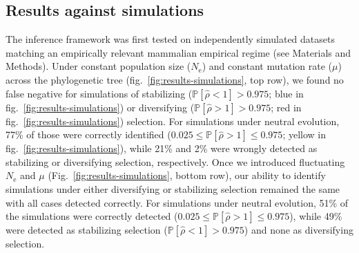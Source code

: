 \documentclass{article}
\newcommand{\Ne}{N_{\text{e}}}
\newcommand{\proba}{\mathbb{P}}
\newcommand{\MutationRate}{\mu}
\newcommand{\EstNI}{\widehat{\rho}}
\begin{document}
\subsection*{Results against simulations}\label{subsec:results-against-simulations}

The inference framework was first tested on independently simulated datasets matching an empirically relevant mammalian empirical regime (see Materials and Methods).
Under constant population size ($\Ne$) and constant mutation rate ($\MutationRate$) across the phylogenetic tree (fig.~\ref{fig:results-simulations}, top row), we found no false negative for simulations of stabilizing ($\proba [\EstNI < 1] > 0.975$; blue in fig.~\ref{fig:results-simulations}) or diversifying ($\proba [\EstNI > 1] > 0.975$; red in fig.~\ref{fig:results-simulations}) selection.
For simulations under neutral evolution, 77\% of those were correctly identified ($0.025 \leq \proba [\EstNI > 1] \leq 0.975$; yellow in fig.~\ref{fig:results-simulations}), while 21\% and 2\% were wrongly detected as stabilizing or diversifying selection, respectively.
Once we introduced fluctuating $\Ne$ and $\MutationRate$ (Fig.~\ref{fig:results-simulations}, bottom row), our ability to identify simulations under either diversifying or stabilizing selection remained the same with all cases detected correctly.
For simulations under neutral evolution, 51\% of the simulations were correctly detected ($0.025 \leq \proba [\EstNI > 1] \leq 0.975$), while 49\% were detected as stabilizing selection ($\proba [\EstNI < 1] > 0.975$) and none as diversifying selection.
\end{document}
